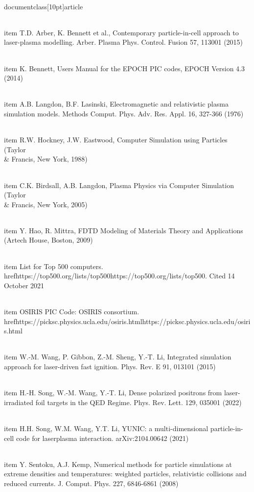 \\documentclass[10pt]{article}
\begin{document}
  \\item T.D. Arber, K. Bennett et al., Contemporary particle-in-cell approach to laser-plasma modelling. Arber. Plasma Phys. Control. Fusion 57, 113001 (2015)

  \\item K. Bennett, Users Manual for the EPOCH PIC codes, EPOCH Version 4.3 (2014)

  \\item A.B. Langdon, B.F. Lasinski, Electromagnetic and relativistic plasma simulation models. Methods Comput. Phys. Adv. Res. Appl. 16, 327-366 (1976)

  \\item R.W. Hockney, J.W. Eastwood, Computer Simulation using Particles (Taylor \\& Francis, New York, 1988)

  \\item C.K. Birdsall, A.B. Langdon, Plasma Physics via Computer Simulation (Taylor \\& Francis, New York, 2005)

  \\item Y. Hao, R. Mittra, FDTD Modeling of Materials Theory and Applications (Artech House, Boston, 2009)

  \\item List for Top 500 computers. \\href{https://top500.org/lists/top500}{https://top500.org/lists/top500}. Cited 14 October 2021

  \\item OSIRIS PIC Code: OSIRIS consortium. \\href{https://picksc.physics.ucla.edu/osiris.html}{https://picksc.physics.ucla.edu/osiris.html}

  \\item W.-M. Wang, P. Gibbon, Z.-M. Sheng, Y.-T. Li, Integrated simulation approach for laser-driven fast ignition. Phys. Rev. E 91, 013101 (2015)

  \\item H.-H. Song, W.-M. Wang, Y.-T. Li, Dense polarized positrons from laser-irradiated foil targets in the QED Regime. Phys. Rev. Lett. 129, 035001 (2022)

  \\item H.H. Song, W.M. Wang, Y.T. Li, YUNIC: a multi-dimensional particle-in-cell code for laserplasma interaction. arXiv:2104.00642 (2021)

  \\item Y. Sentoku, A.J. Kemp, Numerical methods for particle simulations at extreme densities and temperatures: weighted particles, relativistic collisions and reduced currents. J. Comput. Phys. 227, 6846-6861 (2008)
\end{document}
